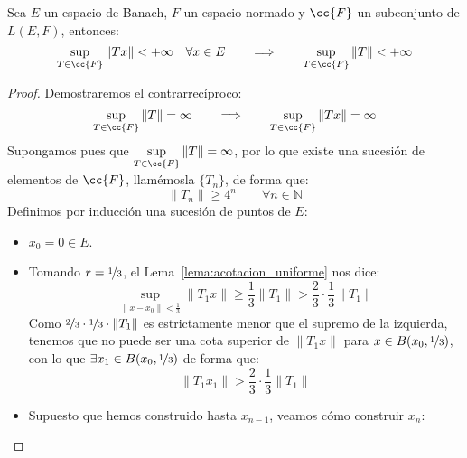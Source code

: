 \begin{teo}\label{teo:principio_acotacion_uniforme}
Sea $E$ un espacio de Banach, $F$ un espacio normado y $\cc{F}$ un subconjunto de $L(E,F)$, entonces:
\begin{equation*}
    \sup_{T\in \cc{F}}\|Tx\| < +\infty \quad \forall x\in E \qquad \Longrightarrow \qquad  \sup_{T\in \cc{F}}\|T\| < +\infty
\end{equation*}
    \begin{proof}
        Demostraremos el contrarrecíproco:
        \begin{equation*}
            \sup_{T\in \cc{F}}\|T\| = \infty \qquad  \Longrightarrow \qquad  \sup_{T\in \cc{F}}\|Tx\| = \infty
        \end{equation*}
        Supongamos pues que $\sup\limits_{T\in \cc{F}}\|T\| = \infty$, por lo que existe una sucesión de elementos de $\cc{F}$, llamémosla $\{T_n\}$, de forma que:
        \begin{equation*}
            \|T_n\| \geq 4^n \qquad \forall n\in \mathbb{N}
        \end{equation*}
        Definimos por inducción una sucesión de puntos de $E$:
        \begin{itemize}
            \item $x_0 = 0\in E$.
            \item Tomando $r = \nicefrac{1}{3}$, el Lema~\ref{lema:acotacion_uniforme} nos dice:
                \begin{equation*}
                    \sup_{\|x-x_0\| < \frac{1}{3}}\|T_1x\| \geq \dfrac{1}{3}\|T_1\| > \dfrac{2}{3}\cdot \dfrac{1}{3}\|T_1\|
                \end{equation*}
                Como $\nicefrac{2}{3}\cdot \nicefrac{1}{3}\cdot \|T_1\|$ es estrictamente menor que el supremo de la izquierda, tenemos que no puede ser una cota superior de $\|T_1 x\|$ para $x\in B(x_0,\nicefrac{1}{3})$, con lo que $\exists x_1\in B(x_0,\nicefrac{1}{3})$ de forma que:
                \begin{equation*}
                    \|T_1x_1\| > \dfrac{2}{3}\cdot \dfrac{1}{3}\|T_1\|
                \end{equation*}
            \item Supuesto que hemos construido hasta $x_{n-1}$, veamos cómo construir $x_n$:


\end{itemize}
\end{proof}
\end{teo}
